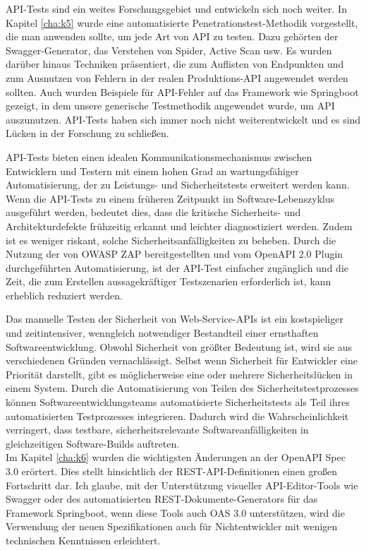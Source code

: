 API-Tests sind ein weites Forschungsgebiet und entwickeln sich noch weiter. In Kapitel \ref{cha:k5} wurde eine automatisierte Penetrationstest-Methodik vorgestellt, die man anwenden sollte, um jede Art von API zu testen. Dazu gehörten der Swagger-Generator, das Verstehen von Spider, Active Scan usw. Es wurden darüber hinaus Techniken präsentiert, die zum Auflisten von Endpunkten und zum Ausnutzen von Fehlern in der realen Produktions-API angewendet werden sollten. Auch wurden Beispiele für API-Fehler auf das Framework wie Springboot gezeigt, in dem unsere generische Testmethodik angewendet wurde, um API auszunutzen. API-Tests haben sich immer noch nicht weiterentwickelt und es sind Lücken in der Forschung zu schließen.

API-Tests bieten einen idealen Kommunikationsmechanismus zwischen Entwicklern und Testern mit einem hohen Grad an wartungsfähiger Automatisierung, der zu Leistungs- und Sicherheitstests erweitert werden kann. Wenn die API-Tests zu einem früheren Zeitpunkt im Software-Lebenszyklus ausgeführt werden, bedeutet dies, dass die kritische Sicherheits- und Architekturdefekte frühzeitig erkannt und leichter diagnostiziert werden. Zudem ist es weniger riskant, solche Sicherheitsanfälligkeiten zu beheben. Durch die Nutzung der von OWASP ZAP bereitgestellten und vom OpenAPI 2.0 Plugin durchgeführten Automatisierung, ist der API-Test einfacher zugänglich und die Zeit, die zum Erstellen aussagekräftiger Testszenarien erforderlich ist, kann erheblich reduziert werden.

Das manuelle Testen der Sicherheit von Web-Service-APIs ist ein kostspieliger und zeitintensiver, wenngleich notwendiger Bestandteil einer ernsthaften Softwareentwicklung. Obwohl Sicherheit von größter Bedeutung ist, wird sie aus verschiedenen Gründen vernachlässigt. Selbst wenn Sicherheit für Entwickler eine Priorität darstellt, gibt es möglicherweise eine oder mehrere Sicherheitslücken in einem System. Durch die Automatisierung von Teilen des Sicherheitstestprozesses können Softwareentwicklungsteams automatisierte Sicherheitstests als Teil ihres automatisierten Testprozesses integrieren. Dadurch wird die Wahrscheinlichkeit verringert, dass testbare, sicherheitsrelevante Softwareanfälligkeiten in gleichzeitigen Software-Builds auftreten.\\


Im Kapitel \ref{cha:k6} wurden die wichtigsten Änderungen an der OpenAPI Spec 3.0 erörtert. Dies stellt hinsichtlich der REST-API-Definitionen einen großen Fortschritt dar. Ich glaube, mit der Unterstützung visueller API-Editor-Tools wie Swagger oder des automatisierten REST-Dokumente-Generators für das Framework Springboot, wenn diese Tools auch OAS 3.0 unterstützen, wird die Verwendung der neuen Spezifikationen auch für Nichtentwickler mit wenigen technischen Kenntnissen erleichtert.

